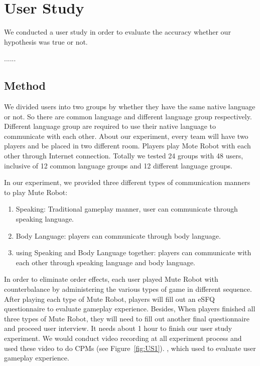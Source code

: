 

\section{User Study}

We conducted a user study in order to evaluate the accuracy whether our hypothesis was true or not.

......

\subsection{Method}

We divided users into two groups by whether they have the same native language or not. So there are common language and different language group respectively. Different language group are required to use their native language to communicate with each other. About our experiment, every team will have two players and be placed in two different room. Players play Mote Robot with each other through Internet connection. Totally we tested 24 groups with 48 users, inclusive of 12 common language groups and 12 different language groups.

In our experiment, we provided three different types of communication manners to play Mute Robot:
\begin{enumerate}
    \item Speaking: 
    Traditional gameplay manner, user can communicate through speaking language.
    \item Body Language: 
    players can communicate through body language.
    \item using Speaking and Body Language together: 
    players can communicate with each other through speaking language and body language.
\end{enumerate}

In order to eliminate order effects, each user played Mute Robot with counterbalance by administering the various types of game in different sequence. After playing each type of Mute Robot, players will fill out an eSFQ\cite{eSFQ} questionnaire to evaluate gameplay experience. Besides, When players finished all three types of Mute Robot, they will need to fill out another final questionnaire and proceed user interview. It needs about 1 hour to finish our user study experiment. We would conduct video recording at all experiment process and used these video to do CPMs\cite{CPMS} (see Figure~\ref{fig:US1}). , which used to evaluate user gameplay experience.

